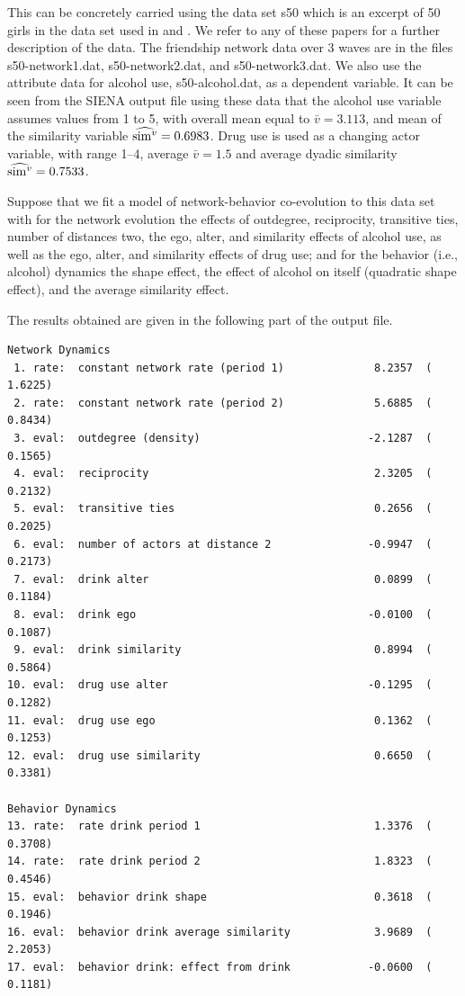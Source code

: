 \documentclass[a4paper,fleqn]{article}
\newcommand{\+}{\, + \,}
\newcommand{\SI}{{\sf SIENA }}
\begin{document}
{This can be concretely carried using the data set {\sf s50}
which is an excerpt of 50 girls in the data set used in
\citet{PearsonMichell00, PearsonWest03,
SteglichEA06} and \citet{SteglichEA10}.
We refer to any of these papers for a further description of the data.
The friendship network data over 3 waves are in
the files {\sf s50-network1.dat}, {\sf s50-network2.dat},
and {\sf s50-network3.dat}.
We also use the attribute data
for alcohol use, {\sf s50-alcohol.dat}, as a dependent variable.
It can be seen from the \SI output file using these data that
the alcohol use variable assumes values from 1 to 5, with overall mean
equal to $\bar v = 3.113$, and mean of the similarity variable $\widehat{{\rm sim}^v} = 0.6983$.
Drug use is used as a changing actor variable, with
range 1--4, average $\bar v = 1.5$ and average dyadic similarity $\widehat{{\rm sim}^v} = 0.7533$.

Suppose that we fit a model of network-behavior co-evolution to this data set
with for the network evolution the effects of outdegree, reciprocity,
transitive ties, number of distances two,
the ego, alter, and similarity effects of alcohol use,
as well as the ego, alter, and similarity effects of drug use;
and for the behavior (i.e., alcohol) dynamics
the shape effect,
the effect of alcohol on itself (quadratic shape effect),
and the average similarity effect.

The results obtained are given in the following
part of the output file.

\begin{verbatim}
Network Dynamics
 1. rate:  constant network rate (period 1)              8.2357  (   1.6225)
 2. rate:  constant network rate (period 2)              5.6885  (   0.8434)
 3. eval:  outdegree (density)                          -2.1287  (   0.1565)
 4. eval:  reciprocity                                   2.3205  (   0.2132)
 5. eval:  transitive ties                               0.2656  (   0.2025)
 6. eval:  number of actors at distance 2               -0.9947  (   0.2173)
 7. eval:  drink alter                                   0.0899  (   0.1184)
 8. eval:  drink ego                                    -0.0100  (   0.1087)
 9. eval:  drink similarity                              0.8994  (   0.5864)
10. eval:  drug use alter                               -0.1295  (   0.1282)
11. eval:  drug use ego                                  0.1362  (   0.1253)
12. eval:  drug use similarity                           0.6650  (   0.3381)

Behavior Dynamics
13. rate:  rate drink period 1                           1.3376  (   0.3708)
14. rate:  rate drink period 2                           1.8323  (   0.4546)
15. eval:  behavior drink shape                          0.3618  (   0.1946)
16. eval:  behavior drink average similarity             3.9689  (   2.2053)
17. eval:  behavior drink: effect from drink            -0.0600  (   0.1181)
\end{verbatim}

}
\end{document}
